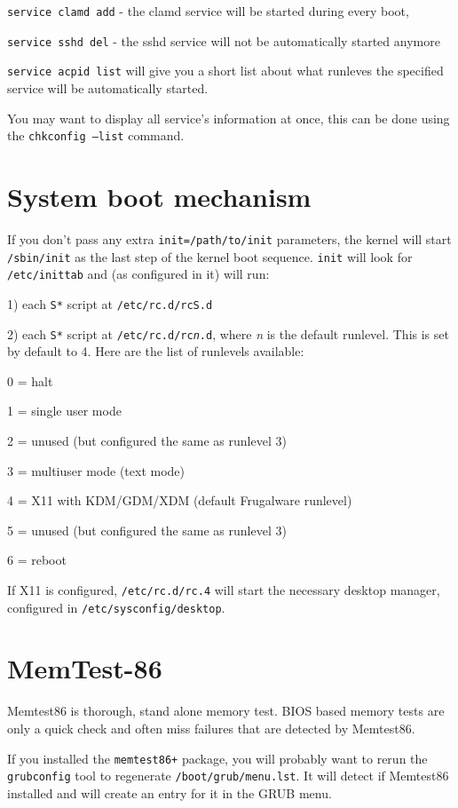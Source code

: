 {\tt service clamd add} - the clamd service will be started during every boot,

{\tt service sshd del} - the sshd service will not be automatically started anymore

{\tt service acpid list} will give you a short list about what runleves the specified service will be automatically started.

You may want to display all service's information at once, this can be done
using the {\tt chkconfig --list} command.

\section{System boot mechanism}

If you don't pass any extra {\tt init=/path/to/init} parameters, the kernel will start {\tt /sbin/init} as the last step of the kernel boot sequence. {\tt init} will look for {\tt /etc/inittab} and (as configured in it) will run:

1) each {\tt S*} script at {\tt /etc/rc.d/rcS.d}

2) each {\tt S*} script at {\tt /etc/rc.d/rc\textit{n}.d}, where \textit{n} is the default runlevel. This is set by default to 4. Here are the list of runlevels available:

0 = halt

1 = single user mode

2 = unused (but configured the same as runlevel 3)

3 = multiuser mode (text mode)

4 = X11 with KDM/GDM/XDM (default Frugalware runlevel)

5 = unused (but configured the same as runlevel 3)

6 = reboot

If X11 is configured, {\tt /etc/rc.d/rc.4} will start the necessary desktop manager, configured in {\tt /etc/sysconfig/desktop}.

\section{MemTest-86}

Memtest86 is thorough, stand alone memory test. BIOS based memory tests are
only a quick check and often miss failures that are detected by Memtest86.

If you installed the {\tt memtest86+} package, you will probably want to rerun
the {\tt grubconfig} tool to regenerate {\tt /boot/grub/menu.lst}. It will
detect if Memtest86 installed and will create an entry for it in the GRUB menu.

